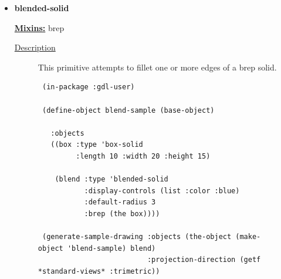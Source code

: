 \documentclass [11pt]{book}
\begin{document}
\begin{itemize}







\item {}
\label{prim:blended-solid}
\textbf{blended-solid}


\textbf{
\underline{Mixins:}} brep





\begin{description}

\item [
\underline{Description}]


This primitive attempts to fillet one or more edges of a brep solid.



\end{description}




\begin{figure}
\begin{lrbox}{\boxedverb}
\begin{minipage}{\linewidth}
{\small

\begin{verbatim}
 (in-package :gdl-user)

 (define-object blend-sample (base-object)
   
   :objects
   ((box :type 'box-solid
         :length 10 :width 20 :height 15)
   
    (blend :type 'blended-solid
           :display-controls (list :color :blue)
           :default-radius 3
           :brep (the box))))

 (generate-sample-drawing :objects (the-object (make-object 'blend-sample) blend)
                          :projection-direction (getf *standard-views* :trimetric))



\end{verbatim}}
\end{minipage}
\end{lrbox}
\end{figure}
\end{itemize}
\end{document}
